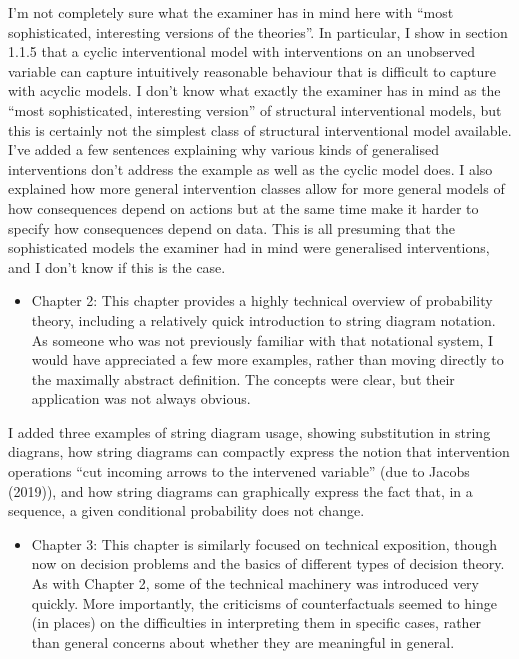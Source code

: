 I'm not completely sure what the examiner has in mind here with ``most sophisticated, interesting versions of the theories''. In particular, I show in section 1.1.5 that a cyclic interventional model with interventions on an unobserved variable can capture intuitively reasonable behaviour that is difficult to capture with acyclic models. I don't know what exactly the examiner has in mind as the ``most sophisticated, interesting version'' of structural interventional models, but this is certainly not the simplest class of structural interventional model available. I've added a few sentences explaining why various kinds of generalised interventions don't address the example as well as the cyclic model does. I also explained how more general intervention classes allow for more general models of how consequences depend on actions but at the same time make it harder to specify how consequences depend on data. This is all presuming that the sophisticated models the examiner had in mind were generalised interventions, and I don't know if this is the case.

\begin{itemize}
    \item Chapter 2: This chapter provides a highly technical overview of probability theory, including a relatively quick introduction to string diagram notation. As someone who was not previously familiar with that notational system, I would have appreciated a few more examples, rather than moving directly to the maximally abstract definition. The concepts were clear, but their application was not always obvious.
\end{itemize}

I added three examples of string diagram usage, showing substitution in string diagrans, how string diagrams can compactly express the notion that intervention operations ``cut incoming arrows to the intervened variable'' (due to Jacobs (2019)), and how string diagrams can graphically express the fact that, in a sequence, a given conditional probability does not change.

\begin{itemize}
    \item Chapter 3: This chapter is similarly focused on technical exposition, though now on decision problems and the basics of different types of decision theory. As with Chapter 2, some of the technical machinery was introduced very quickly. More importantly, the criticisms of counterfactuals seemed to hinge (in places) on the difficulties in interpreting them in specific cases, rather than general concerns about whether they are meaningful in general.
\end{itemize}

